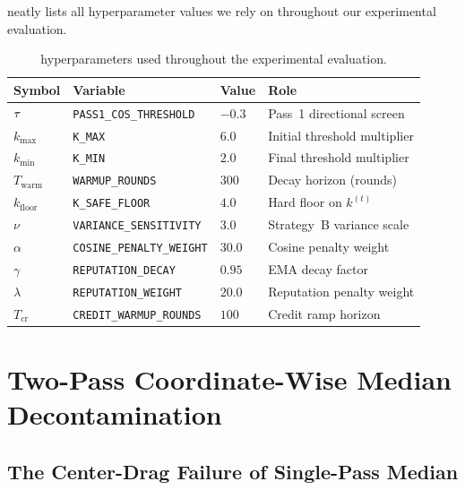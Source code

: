 \documentclass[../main.tex]{subfiles}
\begin{document}
 neatly lists all hyperparameter values we rely on throughout our experimental evaluation.

\begin{table}[htbp]
\centering
\caption{\aegis{} hyperparameters used throughout the experimental evaluation.}
\label{tab:aegis_params}
\begin{tabular}{llll}
\toprule
\textbf{Symbol} & \textbf{Variable} & \textbf{Value} & \textbf{Role} \\
\midrule
$\tau$       & \texttt{PASS1\_COS\_THRESHOLD}   & $-0.3$   & Pass~1 directional screen \\
$k_{\max}$        & \texttt{K\_MAX}                  & $6.0$    & Initial threshold multiplier \\
$k_{\min}$        & \texttt{K\_MIN}                  & $2.0$    & Final threshold multiplier \\
$T_{\text{warm}}$ & \texttt{WARMUP\_ROUNDS}          & $300$    & Decay horizon (rounds) \\
$k_{\text{floor}}$& \texttt{K\_SAFE\_FLOOR}          & $4.0$    & Hard floor on $k^{(t)}$ \\
$\nu$             & \texttt{VARIANCE\_SENSITIVITY}   & $3.0$    & Strategy~B variance scale \\
$\alpha$          & \texttt{COSINE\_PENALTY\_WEIGHT} & $30.0$   & Cosine penalty weight \\
$\gamma$          & \texttt{REPUTATION\_DECAY}       & $0.95$   & EMA decay factor \\
$\lambda$         & \texttt{REPUTATION\_WEIGHT}      & $20.0$   & Reputation penalty weight \\
$T_{\text{cr}}$   & \texttt{CREDIT\_WARMUP\_ROUNDS}  & $100$    & Credit ramp horizon \\
\bottomrule
\end{tabular}
\end{table}

\section{Two-Pass Coordinate-Wise Median Decontamination}
\label{sec:aegis_twopass}

\subsection{The Center-Drag Failure of Single-Pass Median}
\label{sec:aegis_center_drag}
\end{document}
